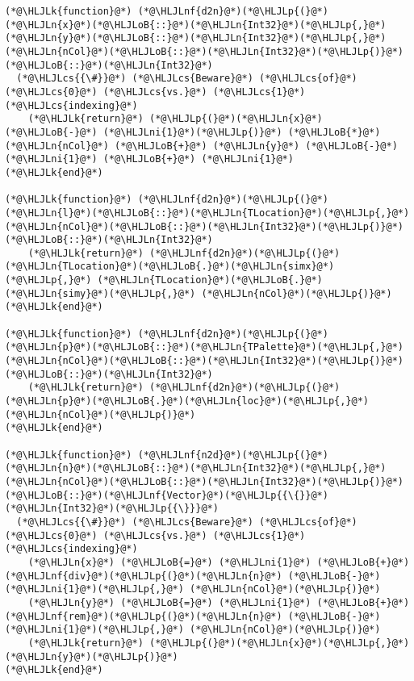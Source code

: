 \documentclass[12pt,a4paper]{article}
\newcommand{\HLJLk}[1]{\textcolor[RGB]{148,91,176}{\textbf{#1}}}
\newcommand{\HLJLn}[1]{#1}
\newcommand{\HLJLnf}[1]{\textcolor[RGB]{66,102,213}{#1}}
\newcommand{\HLJLni}[1]{\textcolor[RGB]{59,151,46}{#1}}
\newcommand{\HLJLoB}[1]{\textcolor[RGB]{102,102,102}{\textbf{#1}}}
\newcommand{\HLJLp}[1]{#1}
\newcommand{\HLJLcs}[1]{\textcolor[RGB]{153,153,119}{\textit{#1}}}
\begin{document}
\begin{lstlisting}
(*@\HLJLk{function}@*) (*@\HLJLnf{d2n}@*)(*@\HLJLp{(}@*)(*@\HLJLn{x}@*)(*@\HLJLoB{::}@*)(*@\HLJLn{Int32}@*)(*@\HLJLp{,}@*) (*@\HLJLn{y}@*)(*@\HLJLoB{::}@*)(*@\HLJLn{Int32}@*)(*@\HLJLp{,}@*) (*@\HLJLn{nCol}@*)(*@\HLJLoB{::}@*)(*@\HLJLn{Int32}@*)(*@\HLJLp{)}@*)(*@\HLJLoB{::}@*)(*@\HLJLn{Int32}@*)
  (*@\HLJLcs{{\#}}@*) (*@\HLJLcs{Beware}@*) (*@\HLJLcs{of}@*) (*@\HLJLcs{0}@*) (*@\HLJLcs{vs.}@*) (*@\HLJLcs{1}@*) (*@\HLJLcs{indexing}@*)
    (*@\HLJLk{return}@*) (*@\HLJLp{(}@*)(*@\HLJLn{x}@*) (*@\HLJLoB{-}@*) (*@\HLJLni{1}@*)(*@\HLJLp{)}@*) (*@\HLJLoB{*}@*) (*@\HLJLn{nCol}@*) (*@\HLJLoB{+}@*) (*@\HLJLn{y}@*) (*@\HLJLoB{-}@*) (*@\HLJLni{1}@*) (*@\HLJLoB{+}@*) (*@\HLJLni{1}@*)
(*@\HLJLk{end}@*)

(*@\HLJLk{function}@*) (*@\HLJLnf{d2n}@*)(*@\HLJLp{(}@*)(*@\HLJLn{l}@*)(*@\HLJLoB{::}@*)(*@\HLJLn{TLocation}@*)(*@\HLJLp{,}@*) (*@\HLJLn{nCol}@*)(*@\HLJLoB{::}@*)(*@\HLJLn{Int32}@*)(*@\HLJLp{)}@*)(*@\HLJLoB{::}@*)(*@\HLJLn{Int32}@*)
    (*@\HLJLk{return}@*) (*@\HLJLnf{d2n}@*)(*@\HLJLp{(}@*)(*@\HLJLn{TLocation}@*)(*@\HLJLoB{.}@*)(*@\HLJLn{simx}@*)(*@\HLJLp{,}@*) (*@\HLJLn{TLocation}@*)(*@\HLJLoB{.}@*)(*@\HLJLn{simy}@*)(*@\HLJLp{,}@*) (*@\HLJLn{nCol}@*)(*@\HLJLp{)}@*)
(*@\HLJLk{end}@*)

(*@\HLJLk{function}@*) (*@\HLJLnf{d2n}@*)(*@\HLJLp{(}@*)(*@\HLJLn{p}@*)(*@\HLJLoB{::}@*)(*@\HLJLn{TPalette}@*)(*@\HLJLp{,}@*) (*@\HLJLn{nCol}@*)(*@\HLJLoB{::}@*)(*@\HLJLn{Int32}@*)(*@\HLJLp{)}@*)(*@\HLJLoB{::}@*)(*@\HLJLn{Int32}@*)
    (*@\HLJLk{return}@*) (*@\HLJLnf{d2n}@*)(*@\HLJLp{(}@*)(*@\HLJLn{p}@*)(*@\HLJLoB{.}@*)(*@\HLJLn{loc}@*)(*@\HLJLp{,}@*) (*@\HLJLn{nCol}@*)(*@\HLJLp{)}@*)
(*@\HLJLk{end}@*)

(*@\HLJLk{function}@*) (*@\HLJLnf{n2d}@*)(*@\HLJLp{(}@*)(*@\HLJLn{n}@*)(*@\HLJLoB{::}@*)(*@\HLJLn{Int32}@*)(*@\HLJLp{,}@*) (*@\HLJLn{nCol}@*)(*@\HLJLoB{::}@*)(*@\HLJLn{Int32}@*)(*@\HLJLp{)}@*)(*@\HLJLoB{::}@*)(*@\HLJLnf{Vector}@*)(*@\HLJLp{{\{}}@*)(*@\HLJLn{Int32}@*)(*@\HLJLp{{\}}}@*)
  (*@\HLJLcs{{\#}}@*) (*@\HLJLcs{Beware}@*) (*@\HLJLcs{of}@*) (*@\HLJLcs{0}@*) (*@\HLJLcs{vs.}@*) (*@\HLJLcs{1}@*) (*@\HLJLcs{indexing}@*)
    (*@\HLJLn{x}@*) (*@\HLJLoB{=}@*) (*@\HLJLni{1}@*) (*@\HLJLoB{+}@*) (*@\HLJLnf{div}@*)(*@\HLJLp{(}@*)(*@\HLJLn{n}@*) (*@\HLJLoB{-}@*) (*@\HLJLni{1}@*)(*@\HLJLp{,}@*) (*@\HLJLn{nCol}@*)(*@\HLJLp{)}@*)
    (*@\HLJLn{y}@*) (*@\HLJLoB{=}@*) (*@\HLJLni{1}@*) (*@\HLJLoB{+}@*) (*@\HLJLnf{rem}@*)(*@\HLJLp{(}@*)(*@\HLJLn{n}@*) (*@\HLJLoB{-}@*) (*@\HLJLni{1}@*)(*@\HLJLp{,}@*) (*@\HLJLn{nCol}@*)(*@\HLJLp{)}@*)
    (*@\HLJLk{return}@*) (*@\HLJLp{(}@*)(*@\HLJLn{x}@*)(*@\HLJLp{,}@*) (*@\HLJLn{y}@*)(*@\HLJLp{)}@*)
(*@\HLJLk{end}@*)
\end{lstlisting}
\end{document}
